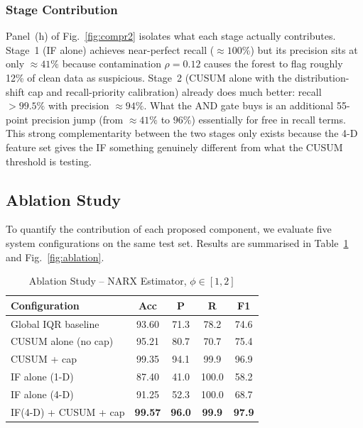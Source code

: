 \documentclass[journal]{IEEEtran}
\begin{document}
\subsubsection{Stage Contribution}

Panel~(h) of Fig.~\ref{fig:compr2} isolates what each stage
actually contributes.
Stage~1 (IF alone) achieves near-perfect recall ($\approx100\%$)
but its precision sits at only $\approx41\%$ because contamination
$\rho=0.12$ causes the forest to flag roughly 12\% of clean data
as suspicious.
Stage~2 (CUSUM alone with the distribution-shift cap and
recall-priority calibration) already does much better:
recall $>99.5\%$ with precision $\approx94\%$.
What the AND gate buys is an additional 55-point precision jump
(from $\approx41\%$ to $96\%$) essentially for free in recall terms.
This strong complementarity between the two stages only exists
because the 4-D feature set gives the IF something genuinely
different from what the CUSUM threshold is testing.

\subsection{Ablation Study}
\label{sec:ablation}

To quantify the contribution of each proposed component, we
evaluate five system configurations on the same test set.
Results are summarised in Table~\ref{tab:ablation} and
Fig.~\ref{fig:ablation}.

\begin{table}[!t]
\caption{Ablation Study -- NARX Estimator, $\phi\in[1,2]$}
\label{tab:ablation}
\centering
\begin{tabular}{|p{3.3cm}|c|c|c|c|}
\hline
\textbf{Configuration} & \textbf{Acc} & \textbf{P} & \textbf{R} & \textbf{F1} \\
\hline
Global IQR baseline      & 93.60 & 71.3 & 78.2 & 74.6 \\
CUSUM alone (no cap)     & 95.21 & 80.7 & 70.7 & 75.4 \\
CUSUM + cap              & 99.35 & 94.1 & 99.9 & 96.9 \\
IF alone (1-D)           & 87.40 & 41.0 & 100.0 & 58.2 \\
IF alone (4-D)           & 91.25 & 52.3 & 100.0 & 68.7 \\
IF(4-D) + CUSUM + cap    & \textbf{99.57} & \textbf{96.0} & \textbf{99.9} & \textbf{97.9} \\
\hline
\end{tabular}
\end{table}
\end{document}
